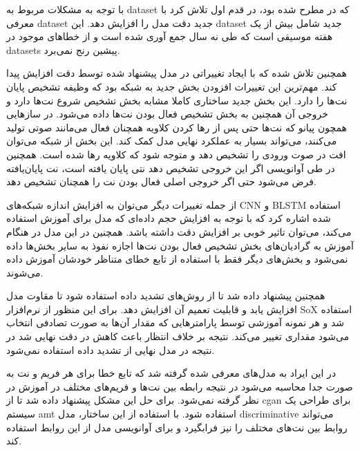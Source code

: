 با توجه به مشکلات مربوط به \gls{dataset} که در \cite{hawthorne2017onsets} مطرح
شده بود، \cite{hawthorne2018enabling} در قدم اول تلاش کرد با معرفی \gls{dataset}
جدید دقت مدل را افزایش دهد. این \gls{dataset} جدید شامل بیش از یک هفته موسیقی
است که طی نه سال جمع آوری شده است و از خطاهای موجود در \glspl{dataset} پیشین رنج
نمی‌برد.

همچنین تلاش شده که با ایجاد تغییراتی در مدل پیشنهاد شده توسط
\cite{hawthorne2017onsets} دقت افزایش پیدا کند. مهم‌ترین این تغییرات افزودن بخش
جدید به شبکه بود که وظیفه تشخیص پایان نت‌ها را دارد. این بخش جدید ساختاری کاملا
مشابه بخش تشخیص شروع نت‌ها دارد و خروجی آن همچنین به بخش تشخیص فعال بودن نت‌ها
داده می‌شود. در سازهایی همچون پیانو که نت‌ها حتی پس از رها کردن کلاویه همچنان
فعال می‌مانند صوتی تولید می‌کنند، می‌تواند بسیار به عملکرد نهایی مدل کمک کند.
این بخش از شبکه می‌توان افت در صوت ورودی را تشخیص دهد و متوجه شود که کلاویه رها
شده است. همچنین در طی آوانویسی اگر این خروجی تشخیص دهد نتی پایان یافته است، نت
پایان‌یافته فرض می‌شود حتی اگر خروجی اصلی فعال بودن نت را همچنان تشخیص دهد.

از جمله تغییرات دیگر می‌توان به افزایش اندازه شبکه‌های \gls{CNN} و \gls{BLSTM}
استفاده شده اشاره کرد که با توجه به افزایش حجم داده‌ای که مدل برای آموزش استفاده
می‌کند، می‌توان تاثیر خوبی بر افزایش دقت داشته باشد. همچنین در این مدل در هنگام
آموزش به گرادیان‌های بخش تشخیص فعال بودن نت‌ها اجازه نفوذ به سایر بخش‌ها داده
نمی‌شود و بخش‌های دیگر فقط با استفاده از تابع خطای متناظر خودشان آموزش داده
می‌شوند.

همچنین پیشنهاد داده شد تا از روش‌های تشدید داده استفاده شود تا مقاوت مدل افزایش
یابد و قابلیت تعمیم آن افزایش دهد. برای این منظور از نرم‌افزار SoX استفاده شد و
هر نمونه آموزشی توسط پارامترهایی که مقدار آن‌ها به صورت تصادفی انتخاب می‌شود
مقداری تغییر می‌کند. نتیجه بر خلاف انتظار باعث کاهش در دقت نهایی شد در نتیجه در
مدل نهایی از تشدید داده استفاده نمی‌شود.

در \cite{kim2019adversarial} این ایراد به مدل‌های معرفی شده گرفته شد که تابع خطا
برای هر فریم و نت به صورت جدا محاسبه می‌شود در نتیجه رابطه بین نت‌ها و فریم‌های
مختلف در آموزش در نظر گرفته نمی‌شود. برای حل این مشکل پیشنهاد داده شد تا از
\gls{cgan} برای طراحی یک سیستم \gls{amt} استفاده شود. با استفاده از این ساختار،
مدل \gls{discriminative} می‌تواند روابط بین نت‌های مختلف را نیز فرابگیرد و برای
آوانویسی مدل از این روابط استفاده کند.


